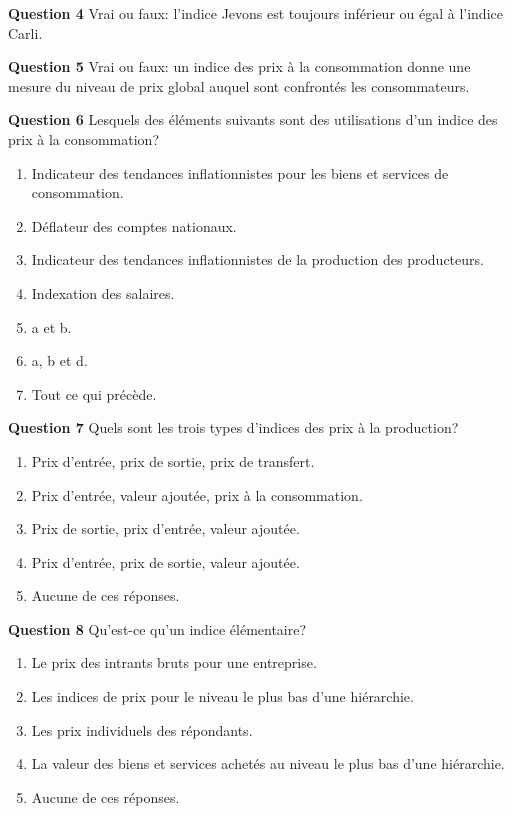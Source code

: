 \documentclass[
]{article}
\begin{document}
\textbf{Question 4} Vrai ou faux: l'indice Jevons est toujours inférieur ou égal à l'indice Carli.

\textbf{Question 5} Vrai ou faux: un indice des prix à la consommation donne une mesure du niveau de prix global auquel sont confrontés les consommateurs.

\textbf{Question 6} Lesquels des éléments suivants sont des utilisations d'un indice des prix à la consommation?

\begin{enumerate}
\def\labelenumi{\alph{enumi})}
\item
  Indicateur des tendances inflationnistes pour les biens et services de consommation.
\item
  Déflateur des comptes nationaux.
\item
  Indicateur des tendances inflationnistes de la production des producteurs.
\item
  Indexation des salaires.
\item
  a et b.
\item
  a, b et d.
\item
  Tout ce qui précède.
\end{enumerate}

\textbf{Question 7} Quels sont les trois types d'indices des prix à la production?

\begin{enumerate}
\def\labelenumi{\alph{enumi})}
\item
  Prix d'entrée, prix de sortie, prix de transfert.
\item
  Prix d'entrée, valeur ajoutée, prix à la consommation.
\item
  Prix de sortie, prix d'entrée, valeur ajoutée.
\item
  Prix d'entrée, prix de sortie, valeur ajoutée.
\item
  Aucune de ces réponses.
\end{enumerate}

\textbf{Question 8} Qu'est-ce qu'un indice élémentaire?

\begin{enumerate}
\def\labelenumi{\alph{enumi})}
\item
  Le prix des intrants bruts pour une entreprise.
\item
  Les indices de prix pour le niveau le plus bas d'une hiérarchie.
\item
  Les prix individuels des répondants.
\item
  La valeur des biens et services achetés au niveau le plus bas d'une hiérarchie.
\item
  Aucune de ces réponses.
\end{enumerate}
\end{document}
